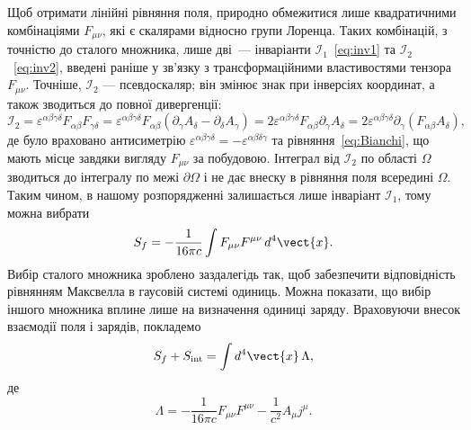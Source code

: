 Щоб отримати лінійні рівняння поля, природно обмежитися лише квадратичними
комбінаціями $F_{\mu\nu}$, які є скалярами відносно групи Лоренца.
Таких комбінацій, з точністю до сталого множника, лише дві~--- інваріанти
$\mathcal{I}_1$~\eqref{eq:inv1} та $\mathcal{I}_2$~\eqref{eq:inv2}, введені раніше
у зв'язку з трансформаційними властивостями тензора $F_{\mu\nu}$.
Точніше, $\mathcal{I}_2$ --- псевдоскаляр; він змінює знак при інверсіях координат, а також зводиться до повної дивергенції:
\begin{equation*}
    \mathcal{I}_2 = \varepsilon^{\alpha\beta\gamma\delta}F_{\alpha\beta}F_{\gamma\delta}
    = \varepsilon^{\alpha\beta\gamma\delta}F_{\alpha\beta}(\partial_{\gamma}A_{\delta}
    - \partial_{\delta}A_{\gamma})
    = 2\varepsilon^{\alpha\beta\gamma\delta}F_{\alpha\beta}\partial_{\gamma}A_{\delta}
    = 2\varepsilon^{\alpha\beta\gamma\delta}\partial_{\gamma}(F_{\alpha\beta}A_{\delta}),
\end{equation*}
де було враховано антисиметрію $\varepsilon^{\alpha\beta\gamma\delta}=-\varepsilon^{\alpha\beta\delta\gamma}$ та рівняння~\eqref{eq:Bianchi}, що мають місце завдяки вигляду $F_{\mu\nu}$ за побудовою. Інтеграл від $\mathcal{I}_2$ по області $\Omega$ зводиться до інтегралу по межі $\partial\Omega$ і не дає внеску в рівняння поля всередині $\Omega$. Таким чином, в нашому розпорядженні залишається лише інваріант $\mathcal{I}_1$, тому можна вибрати
\begin{equation}\label{eq:Sf}
    S_f = -\frac{1}{16\pi c}\int F_{\mu\nu}F^{\mu\nu}\,d^4\vect{x}.
\end{equation}
Вибір сталого множника зроблено заздалегідь так, щоб забезпечити відповідність рівнянням Максвелла в гаусовій системі одиниць. Можна показати, що вибір іншого множника вплине лише на визначення одиниці заряду. Враховуючи внесок взаємодії поля і зарядів, покладемо
\begin{equation}\label{eq:Sf_Sint_total}
    S_f + S_{\text{int}} = \int d^4\vect{x}\,\Lambda,
\end{equation}
де
\begin{equation*}
    \Lambda = -\frac{1}{16\pi c}F_{\mu\nu}F^{\mu\nu}
    - \frac{1}{c^2}A_{\mu}j^{\mu}.
\end{equation*}

